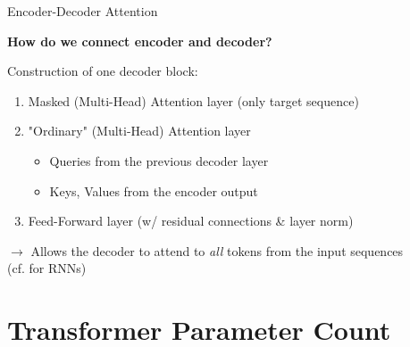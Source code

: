 \begin{vbframe}{Encoder-Decoder Attention}

\vfill

\textbf{\ques How do we connect encoder and decoder?}\\

\vspace{.3cm}

Construction of one decoder block:

\vspace{.3cm}

	\begin{enumerate}
		\item Masked (Multi-Head) Attention layer (only target sequence)
		\item "Ordinary" (Multi-Head) Attention layer
			\begin{itemize}
				\item Queries from the previous decoder layer
				\item Keys, Values from the encoder output
			\end{itemize}
		\item Feed-Forward layer (w/ residual connections \& layer norm)
	\end{enumerate}

\vspace{.3cm}

$\to$ Allows the decoder to attend to \textit{all} tokens from the input sequences\\
(cf.  for RNNs)

\vfill

\end{vbframe}


\section{Transformer Parameter Count}

